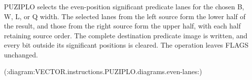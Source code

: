PUZIPLO selects the even-position significant predicate lanes for the chosen B, W, L, or Q width.
The selected lanes from the left source form the lower half of the result, and those from the right source form the upper half, with each half retaining source order.
The complete destination predicate image is written, and every bit outside its significant positions is cleared.
The operation leaves FLAGS unchanged.

(:diagram:VECTOR.instructions.PUZIPLO.diagrams.even-lanes:)
